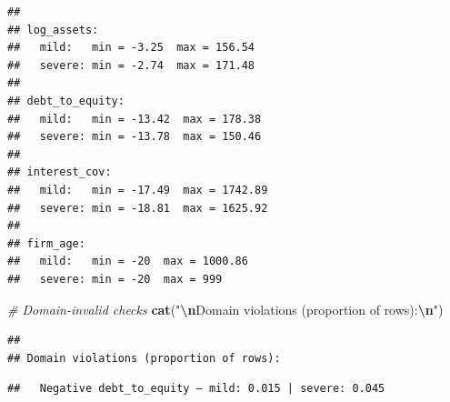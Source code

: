 \documentclass[
]{article}
\newenvironment{Shaded}{\begin{snugshade}}{\end{snugshade}}
\newcommand{\CommentTok}[1]{\textcolor[rgb]{0.56,0.35,0.01}{\textit{#1}}}
\newcommand{\DecValTok}[1]{\textcolor[rgb]{0.00,0.00,0.81}{#1}}
\newcommand{\FunctionTok}[1]{\textcolor[rgb]{0.13,0.29,0.53}{\textbf{#1}}}
\newcommand{\NormalTok}[1]{#1}
\newcommand{\SpecialCharTok}[1]{\textcolor[rgb]{0.81,0.36,0.00}{\textbf{#1}}}
\newcommand{\StringTok}[1]{\textcolor[rgb]{0.31,0.60,0.02}{#1}}
\begin{document}
\begin{verbatim}
## 
## log_assets:
##   mild:   min = -3.25  max = 156.54 
##   severe: min = -2.74  max = 171.48 
## 
## debt_to_equity:
##   mild:   min = -13.42  max = 178.38 
##   severe: min = -13.78  max = 150.46 
## 
## interest_cov:
##   mild:   min = -17.49  max = 1742.89 
##   severe: min = -18.81  max = 1625.92 
## 
## firm_age:
##   mild:   min = -20  max = 1000.86 
##   severe: min = -20  max = 999
\end{verbatim}

\begin{Shaded}
\begin{Highlighting}[]
\CommentTok{\# Domain{-}invalid checks}
\FunctionTok{cat}\NormalTok{(}\StringTok{"}\SpecialCharTok{\textbackslash{}n}\StringTok{Domain violations (proportion of rows):}\SpecialCharTok{\textbackslash{}n}\StringTok{"}\NormalTok{)}
\end{Highlighting}
\end{Shaded}

\begin{verbatim}
## 
## Domain violations (proportion of rows):
\end{verbatim}

\begin{Shaded}
\end{Shaded}

\begin{verbatim}
##   Negative debt_to_equity — mild: 0.015 | severe: 0.045
\end{verbatim}

\begin{Shaded}
\end{Shaded}
\end{document}
